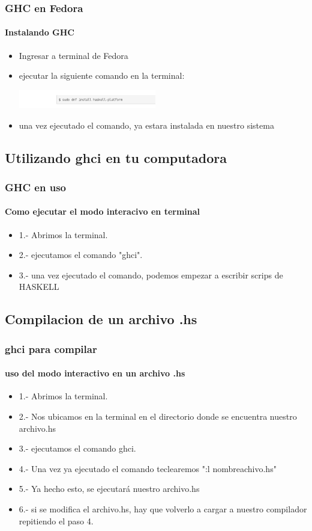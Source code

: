 \documentclass[hyperref={pdfpagelayout=SinglePage}]{beamer} %
\begin{document}
\begin{frame}
  \frametitle{GHC en Fedora}
  \framesubtitle{Instalando GHC}
  \begin{itemize}[<+->]
  \item Ingresar a terminal de Fedora 
  \item ejecutar la siguiente comando en la terminal:\\\begin{center}
                                                    \includegraphics[width=6cm]{ghcfedora.png}
                                                \end{center}
  \item una vez ejecutado el comando, ya estara instalada en nuestro sistema

  \end{itemize}
\end{frame}
\subsection{Utilizando ghci en tu computadora} 
\begin{frame}
  \frametitle{GHC en uso}
  \framesubtitle{Como ejecutar el modo interacivo en terminal}
  \begin{itemize}[<+->]
  \item1.- Abrimos la terminal.
  \item2.- ejecutamos el comando "ghci".
  \item3.- una vez ejecutado el comando, podemos empezar a  escribir scrips de HASKELL
  \end{itemize}
\end{frame}
\subsection{Compilacion de un archivo .hs} 
\begin{frame}
  \frametitle{ghci para compilar}
  \framesubtitle{uso del modo interactivo en un archivo .hs}
  \begin{itemize}[<+->]
  \item1.- Abrimos la terminal.
  \item2.- Nos ubicamos en la terminal en el directorio donde se encuentra nuestro archivo.hs
  \item3.- ejecutamos el comando ghci.
  \item4.- Una vez ya ejecutado el comando teclearemos ":l nombreachivo.hs"
  \item5.- Ya hecho esto, se ejecutará nuestro archivo.hs
  \item6.- si se modifica el archivo.hs, hay que volverlo a cargar a nuestro compilador repitiendo el paso 4.
  \end{itemize}
\end{frame}
\end{document}
